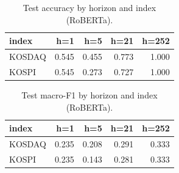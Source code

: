 \begin{table}[t]\centering
\caption{Test accuracy by horizon and index (RoBERTa).}
\begin{tabular}{lrrrr}
\toprule
index & h=1 & h=5 & h=21 & h=252 \\
\midrule
KOSDAQ & 0.545 & 0.455 & 0.773 & 1.000 \\
KOSPI & 0.545 & 0.273 & 0.727 & 1.000 \\
\bottomrule
\end{tabular}
\end{table}

\begin{table}[t]\centering
\caption{Test macro-F1 by horizon and index (RoBERTa).}
\begin{tabular}{lrrrr}
\toprule
index & h=1 & h=5 & h=21 & h=252 \\
\midrule
KOSDAQ & 0.235 & 0.208 & 0.291 & 0.333 \\
KOSPI & 0.235 & 0.143 & 0.281 & 0.333 \\
\bottomrule
\end{tabular}
\end{table}
